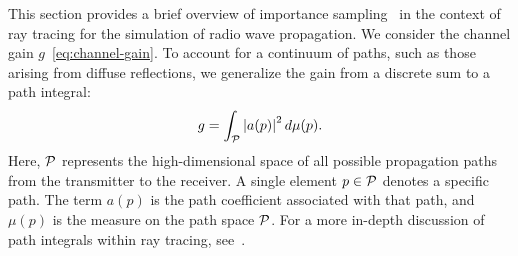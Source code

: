 This section provides a brief overview of importance sampling~\cite{Kloek1978, Wikipedia_Importance_Sampling} in the context of ray tracing for the simulation of radio wave propagation.
We consider the channel gain $g$~\eqref{eq:channel-gain}.
To account for a continuum of paths, such as those arising from diffuse reflections, we generalize the gain from a discrete sum to a path integral:
\begin{equation}
    g = \int_{{\cal P}} \left| a(p) \right|^2 d\mu(p) .\label{eq:channel-gain-continue}
\end{equation}
Here, ${\cal P}$ represents the high-dimensional space of all possible propagation paths from the transmitter to the receiver.
A single element $p \in {\cal P}$ denotes a specific path.
The term $a(p)$ is the path coefficient associated with that path, and $\mu(p)$ is the measure on the path space ${\cal P}$.
For a more in-depth discussion of path integrals within ray tracing, see~\cite[Chapter 8]{Veach:1997:RMC}.

